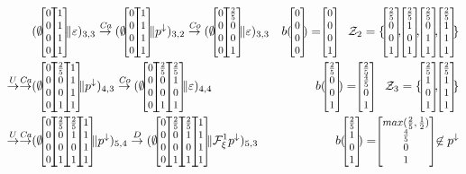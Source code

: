 \begin{example}
	\begin{figure}[t]
		{\footnotesize
			\begin{align*}
				                                                                                                                                                                                    & (\emptyset\cvec{0}{0}{0}{0}\cvec{1}{1}{1}{1} \| \varepsilon)_{3,3}
				\tr{\mathit{Ca}} (\emptyset\cvec{0}{0}{0}{0}\cvec{1}{1}{1}{1} \| p^\downarrow )_{3,2} \tr{\mathit{Co}} (\emptyset\cvec{0}{0}{0}{0}\cvec{\frac{2}{5}}{0}{0}{1} \| \varepsilon)_{3,3} & b(\cvec{0}{0}{0}{0})=\cvec{0}{0}{0}{1} \quad \mathcal{Z}_2 = \{\cvec{\frac{2}{5}}{0}{0}{1}, \cvec{\frac{2}{5}}{1}{0}{1},\cvec{\frac{2}{5}}{0}{1}{1}, \cvec{\frac{2}{5}}{1}{1}{1} \}                                                                                                                                                                                                                                                                                                                                                \\
				\tr{U}  \tr{\mathit{Ca}}                                                                                                                                                            & (\emptyset\cvec{0}{0}{0}{0}\cvec{\frac{2}{5}}{0}{0}{1} \cvec{1}{1}{1}{1}\| p^\downarrow)_{4,3} \tr{\mathit{Co}} (\emptyset\cvec{0}{0}{0}{0}\cvec{\frac{2}{5}}{0}{0}{1} \cvec{\frac{2}{5}}{1}{0}{1} \| \varepsilon)_{4,4}                                                                                                                                     & b(\cvec{\frac{2}{5}}{0}{0}{1})= \cvec{\frac{2}{5}}{\frac{4}{5}}{0}{1} \quad \mathcal{Z}_3 = \{ \cvec{\frac{2}{5}}{1}{0}{1}, \cvec{\frac{2}{5}}{1}{1}{1} \}          \\
				\tr{U} \tr{\mathit{Ca}}                                                                                                                                                             & (\emptyset\cvec{0}{0}{0}{0}\cvec{\frac{2}{5}}{0}{0}{1} \cvec{\frac{2}{5}}{1}{0}{1} \cvec{1}{1}{1}{1} \| p^\downarrow)_{5,4}  \tr{D}  (\emptyset\cvec{0}{0}{0}{0}\cvec{\frac{2}{5}}{0}{0}{1} \cvec{\frac{2}{5}}{1}{0}{1} \cvec{1}{1}{1}{1} \| \mathcal{F}^1_\xi p^\downarrow)_{5,3}                                                                           & b(\cvec{\frac{2}{5}}{1}{0}{1})= \cvec{max(\frac{2}{5},\frac{1}{2})}{\frac{4}{5}}{0}{1} \not \in p^\downarrow                                                        \\

\end{align*}}
\end{figure}
\end{example}
